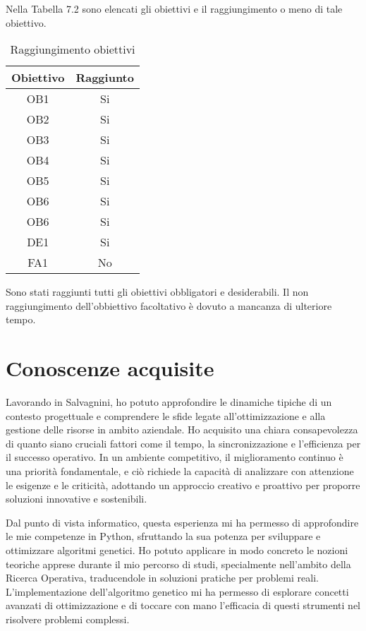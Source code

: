 Nella Tabella 7.2 sono elencati gli obiettivi e il raggiungimento o meno di tale obiettivo.

\begin{table}[H]
    \centering
    \begin{tabular}{|c|c|}
    \hline
    \textbf{Obiettivo} & \textbf{Raggiunto} \\ \hline
    OB1 & Si \\ \hline
    OB2 & Si \\ \hline
    OB3 & Si \\ \hline
    OB4 & Si \\ \hline
    OB5 & Si \\ \hline
    OB6 & Si \\ \hline
    OB6 & Si \\ \hline
    DE1 & Si \\ \hline
    FA1 & No \\ \hline
    \end{tabular}
    \caption{Raggiungimento obiettivi}
\end{table}

Sono stati raggiunti tutti gli obiettivi obbligatori e desiderabili. Il non raggiungimento dell'obbiettivo facoltativo è dovuto a mancanza di ulteriore tempo.

\section{Conoscenze acquisite}

Lavorando in Salvagnini, ho potuto approfondire le dinamiche tipiche di un contesto progettuale e comprendere le sfide legate all'ottimizzazione e alla gestione delle risorse in ambito aziendale. Ho acquisito una chiara consapevolezza di quanto siano cruciali fattori come il tempo, la sincronizzazione e l'efficienza per il successo operativo. In un ambiente competitivo, il miglioramento continuo è una priorità fondamentale, e ciò richiede la capacità di analizzare con attenzione le esigenze e le criticità, adottando un approccio creativo e proattivo per proporre soluzioni innovative e sostenibili.

Dal punto di vista informatico, questa esperienza mi ha permesso di approfondire le mie competenze in Python, sfruttando la sua potenza per sviluppare e ottimizzare algoritmi genetici. Ho potuto applicare in modo concreto le nozioni teoriche apprese durante il mio percorso di studi, specialmente nell'ambito della Ricerca Operativa, traducendole in soluzioni pratiche per problemi reali. L'implementazione dell'algoritmo genetico mi ha permesso di esplorare concetti avanzati di ottimizzazione e di toccare con mano l’efficacia di questi strumenti nel risolvere problemi complessi.

